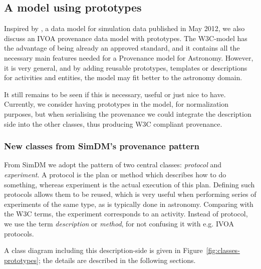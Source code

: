 \documentclass[11pt,a4paper]{ivoa}
\begin{document}
\subsection{A model using prototypes}
Inspired by \cite{std:SimDM}, a data model for simulation data published in May 2012, we also discuss an IVOA provenance data model with prototypes. 
The W3C-model has the advantage of being already an approved standard, and it contains all the necessary main features needed for a Provenance model for Astronomy. However, it is very general, and by adding reusable prototypes, templates or descriptions for activities and entities,  the model may fit better to the astronomy domain.

It still remains to be seen if this is necessary, useful or just nice to have. Currently, we consider having prototypes in the model, for normalization purposes, but when serialising the provenance we could integrate the description side into the other classes, thus producing W3C compliant provenance.



\subsubsection{New classes from SimDM's provenance pattern}
From SimDM we adopt the pattern of two central classes: \emph{protocol} and \emph{experiment}.  A protocol is the plan or method
which describes how to do something, whereas experiment is the actual execution of
this plan. Defining such protocols allows them to be reused, which is very useful when performing series of experiments of the same type, as is typically done in astronomy. Comparing with the W3C terms, the experiment corresponds to an activity. Instead of protocol, we use the term \emph{description} or \emph{method}, 
for not confusing it with e.g. IVOA protocols.

A class diagram including this description-side %
is given in Figure~\ref{fig:classes-prototypes}; the details are described in the following sections.
\end{document}
